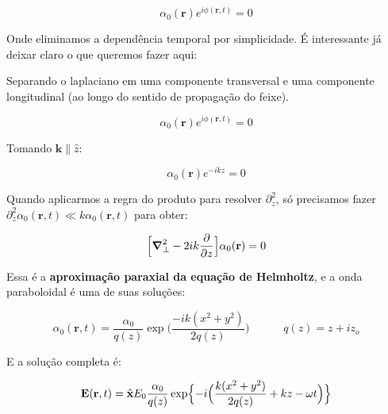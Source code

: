 \documentclass[12pt,a4paper]{report}
\begin{document}
\begin{equation}
    [\grad^2+k^2]\alpha_0(\textbf{r})e^{i\phi(\textbf{r},t)}=0
\end{equation}

Onde eliminamos a dependência temporal por simplicidade. É interessante já deixar claro o que queremos fazer aqui:

\begin{center}
\end{center}

Separando o laplaciano em uma componente transversal e uma componente longitudinal (ao longo do sentido de propagação do feixe).

\begin{equation}
    [\grad_\perp^2+\partial^2_z+k^2]\alpha_0(\textbf{r})e^{i\phi(\textbf{r},t)}=0
\end{equation}

Tomando $\textbf{k}\parallel\hat{z}$:

\begin{equation}
    [\grad_\perp^2+\partial^2_z+k^2]\alpha_0(\textbf{r})e^{-ikz}=0
\end{equation}

Quando aplicarmos a regra do produto para resolver $\partial^2_z$, só precisamos fazer $\partial^2_z\alpha_0(\textbf{r},t)\ll k\alpha_0(\textbf{r},t)$ para obter:

\begin{equation}
    \Bigl[\grad_\perp^2-2ik\frac{\partial}{\partial z}\Bigr]\alpha_0(\textbf{r})=0
\end{equation}

Essa é a \textbf{aproximação paraxial da equação de Helmholtz}, e a onda paraboloidal é uma de suas soluções:

\begin{equation}
    \alpha_0(\textbf{r},t)=\frac{\alpha_0}{q(z)}\exp\Bigr(\frac{-ik(x^2+y^2)}{2q(z)}\Bigr)\;\;\;\;\;\;\;\;\;\;\;q(z)=z+iz_o
    \label{complex.amplitude}
\end{equation}

E a solução completa é:

\begin{equation}
    \textbf{E}(\textbf{r},t)=\hat{\textbf{x}}E_0\frac{\alpha_0}{q(z)}\exp\Bigl\{-i\Bigr(\frac{k(x^2+y^2)}{2q(z)}+kz-\omega t\Bigr)\Bigr\}
\end{equation}
\end{document}
